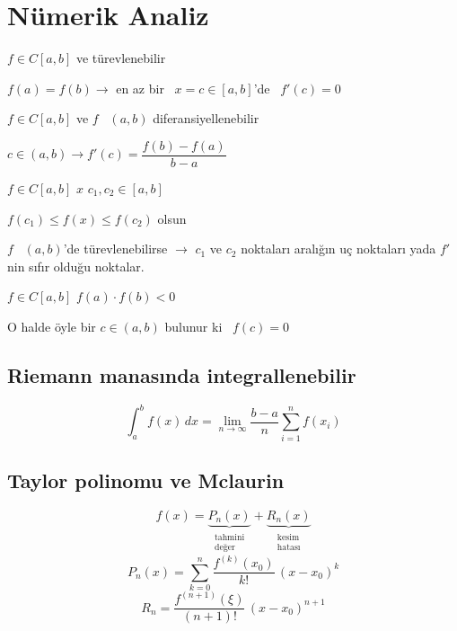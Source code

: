 \documentclass[11pt,a4paper]{article}
\begin{document}

\section{Nümerik Analiz}

\begin{teorem}
  $f \in C[a,b]$ \quad ve türevlenebilir

  $f(a) = f(b) \rightarrow$ en az bir \ $x = c \in [a,b]$'de \ $f'(c) = 0$
\end{teorem}

\begin{teorem}
  $f \in C[a,b]$ \quad ve \quad $f$ \ $(a,b)$ diferansiyellenebilir

  $c \in (a,b) \longrightarrow f'(c) = \dfrac{f(b) - f(a)}{b - a}$
\end{teorem}

\begin{teorem}
  $f \in C[a,b]$ \qquad $x$ \okunamadi{$\in$} $c_1, c_2 \in [a,b]$

  \qquad $f(c_1) \le f(x) \le f(c_2)$ olsun

  $f$ \ $(a,b)$'de türevlenebilirse $\rightarrow$ $c_1$ ve $c_2$ noktaları aralığın uç noktaları
  yada $f'$nin sıfır olduğu noktalar.
\end{teorem}

\begin{teorem}
  $f \in C[a,b]$ \quad $f(a) \cdot f(b) < 0$

  O halde öyle bir $c \in (a,b)$ bulunur ki \ $f(c) = 0$
\end{teorem}

\subsection{Riemann manasında integrallenebilir}
\[ \int_a^b f(x)\,dx = \lim_{n \to \infty} \frac{b-a}{n} \sum_{i=1}^{n} f(x_i) \]

\subsection{Taylor polinomu ve Mclaurin}
\[
  f(x) = \underbrace{P_n(x)}_{\substack{\text{tahmini}\\ \text{değer}}}
       + \underbrace{R_n(x)}_{\substack{\text{kesim}\\ \text{hatası}}}
\]
\[ P_n(x) = \sum_{k=0}^{n} \frac{f^{(k)}(x_0)}{k!}\,(x - x_0)^k \]
\[ R_n = \frac{f^{(n+1)}(\xi)}{(n+1)!}\,(x - x_0)^{n+1} \]
\end{document}
